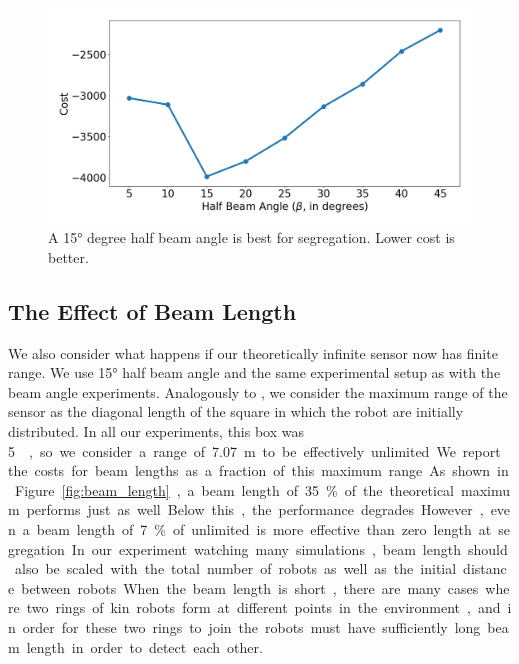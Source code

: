 \documentclass[conference]{IEEEtran}
\begin{document}
    \begin{figure}[H]
      \centering
      \includegraphics[width=1\linewidth]{./images/beam_angle.png}
      \caption{A \ang{15} degree half beam angle is best for segregation. Lower cost is better.}
      \label{fig:beam_angle}
    \end{figure}

  \subsection{The Effect of Beam Length} \label{section:beam_length}

    We also consider what happens if our theoretically infinite sensor now has finite range. We use \ang{15} half beam angle and the same experimental setup as with the beam angle experiments. Analogously to \cite{gauci_self-organized_2014}, we consider the maximum range of the sensor as the diagonal length of the square in which the robot are initially distributed. In all our experiments, this box was \SI{5}{\meter\square}, so we consider a range of \SI{7.07}{\meter} to be effectively unlimited. We report the costs for beam lengths as a fraction of this maximum range. As shown in Figure \ref{fig:beam_length}, a beam length of 35\% of the theoretical maximum performs just as well. Below this, the performance degrades. However, even a beam length of 7\% of unlimited is more effective than zero length at segregation. In our experiment watching many simulations, beam length should also be scaled with the total number of robots as well as the initial distance between robots. When the beam length is short, there are many cases where two rings of kin robots form at different points in the environment, and in order for these two rings to join the robots must have sufficiently long beam length in order to detect each other.
\end{document}
